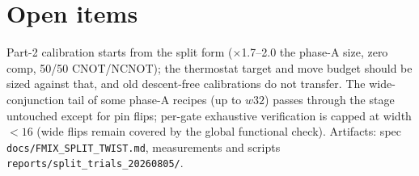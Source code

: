 \documentclass[11pt]{article}
\begin{document}
\section{Open items}

Part-2 calibration starts from the split form ($\times$1.7--2.0 the phase-A
size, zero comp, 50/50 CNOT/NCNOT); the thermostat target and move budget
should be sized against that, and old descent-free calibrations do not
transfer. The wide-conjunction tail of some phase-A recipes (up to $w32$)
passes through the stage untouched except for pin flips; per-gate exhaustive
verification is capped at width $<16$ (wide flips remain covered by the
global functional check). Artifacts: spec \texttt{docs/FMIX\_SPLIT\_TWIST.md},
measurements and scripts \texttt{reports/split\_trials\_20260805/}.
\end{document}
